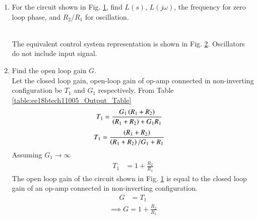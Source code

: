 \begin{enumerate}[label=\thesection.\arabic*.,ref=\thesection.\theenumi]

\item For the circuit shown in Fig. \ref{fig:ee18btech11047_fig1}, find $L(s)$, $L(j\omega)$, the frequency for zero loop phase, and $R_{2}/R_{1}$ for oscillation.
\renewcommand{\thefigure}{\theenumi.\arabic{figure}}
%
\begin{figure}[!ht]
	\begin{center}
		\resizebox{\columnwidth}{!}{}
	\end{center}
\caption{}
\label{fig:ee18btech11047_fig1}
\end{figure}
%
\\
\solution The equivalent control system representation is shown in Fig. \ref{fig:ee18btech11047_fig2}. Oscillators do not include input signal.
\begin{figure}[!ht]
	\begin{center}
		\resizebox{\columnwidth}{!}{}
	\end{center}
\caption{}
\label{fig:ee18btech11047_fig2}
\end{figure}
\renewcommand{\thefigure}{\theenumi}
\item Find the open loop gain $G$.\\
\solution Let the closed loop gain, open-loop gain of op-amp connected in non-inverting configuration be $T_{1}$ and $G_{1}$ respectively.
From Table \ref{table:ee18btech11005_Output_Table}
\begin{align}
T_{1} &= \frac{G_{1}\left(R_1+R_2\right)}{\left(R_1+R_2\right)+G_{1}R_1}
\end{align}
\begin{align}
T_{1} &= \frac{\left(R_1+R_2\right)}{\left(R_1+R_2\right)/G_{1}+R_1}
\end{align}
Assuming $G_{1}\to\infty$
\begin{align}
T_{1} &= 1 + \frac{R_{2}}{R_{1}}
\end{align}
The open loop gain of the circuit shown in Fig. \ref{fig:ee18btech11047_fig1} is equal to the closed loop gain of an op-amp connected in non-inverting configuration.
\begin{align}
G &= T_{1}
\end{align}
\begin{align}
\label{eq:ee18btech11047_1}
\implies G = 1 + \frac{R_{2}}{R_{1}}
\end{align}

\end{enumerate}
